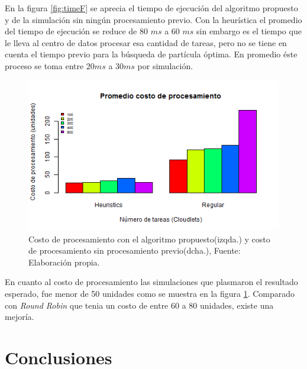 \documentclass[jou,apacite]{apa6}
\begin{document}
En la figura \ref{fig:timeF} se aprecia el tiempo de ejecución del algoritmo propuesto y de la simulación sin ningún procesamiento previo. Con la heurística el promedio del tiempo de ejecución se reduce de 80 $ms$ a 60 $ms$ sin embargo es el tiempo que le lleva al centro de datos procesar esa cantidad de tareas, pero no se tiene en cuenta el tiempo previo para la búsqueda de partícula óptima. En promedio éste proceso se toma entre 20$ms$ a 30$ms$ por simulación.

\renewcommand\thefigure{\arabic{figure}}
\begin{figure}[h!] 
	\centering
	\includegraphics[scale=0.5]{media/costoFinal}
	\caption{Costo de procesamiento con el algoritmo propuesto(izqda.) y costo de procesamiento sin procesamiento previo(dcha.), Fuente: Elaboraci\'on propia.}
	\label{fig:costF}
\end{figure}

En cuanto al costo de procesamiento las simulaciones que plasmaron el resultado esperado, fue menor de 50 unidades como se muestra en la figura \ref{fig:costF}. Comparado con \textit{Round Robin} que tenia un costo de entre 60 a 80 unidades, existe una mejoría.

\section{Conclusiones}
\end{document}
